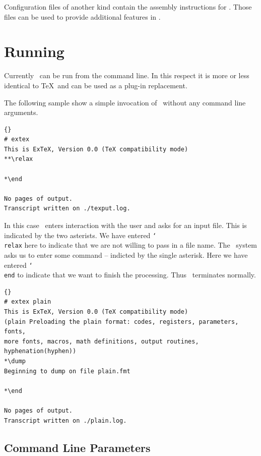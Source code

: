 \documentclass{extex-doc}
\makeatletter
\newcommand\macro[1]{\texttt{\char`\\#1}\index{#1@\texttt{\char`\\#1}}}
\makeatother
\begin{document}
Configuration files of another kind contain the assembly instructions
for \ExTeX. Those files can be used to provide additional features in
\ExTeX. 

\INCOMPLETE


\section{Running \ExTeX}

Currently \ExTeX\ can be run from the command line. In this respect it
is more or less identical to \TeX\ and can be used as a plug-in
replacement.

The following sample show a simple invocation of \ExTeX\ without any
command line arguments.

{%
\begin{lstlisting}{}
# extex
This is ExTeX, Version 0.0 (TeX compatibility mode)
**\relax

*\end

No pages of output.
Transcript written on ./texput.log.
\end{lstlisting}}

In this case \ExTeX\ enters interaction with the user and asks for an
input file. This is indicated by the two asterists. We have entered
\macro{relax} here to indicate that we are not willing to pass in a
file name. The \ExTeX\ system asks us to enter some command --
indicted by the single asterisk. Here we have entered \macro{end} to
indicate that we want to finish the processing. Thus \ExTeX\ 
terminates normally.

\INCOMPLETE

{%
\begin{lstlisting}{}
# extex plain
This is ExTeX, Version 0.0 (TeX compatibility mode)
(plain Preloading the plain format: codes, registers, parameters, fonts,
more fonts, macros, math definitions, output routines, hyphenation(hyphen))
*\dump
Beginning to dump on file plain.fmt

*\end

No pages of output.
Transcript written on ./plain.log.
\end{lstlisting}}


\subsection{Command Line Parameters}
\end{document}
